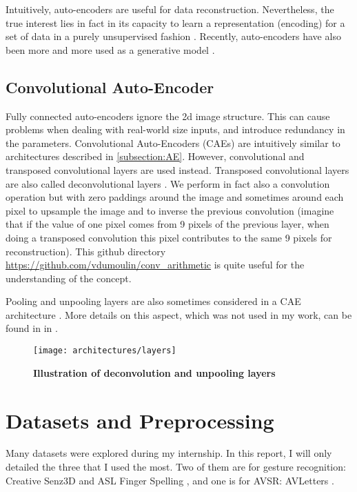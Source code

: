 Intuitively, auto-encoders are useful for data reconstruction.
Nevertheless, the true interest lies in fact in its capacity to learn
a representation (encoding) for a set of data in a purely unsupervised
fashion \cite{P. Vincent 2010}. Recently, auto-encoders have also
been more and more used as a generative model \cite{Y. Bengio 2013}.

\subsection{Convolutional Auto-Encoder}

Fully connected auto-encoders ignore the 2d image structure.
This can cause problems when dealing with real-world size inputs,
and introduce redundancy in the parameters.
Convolutional Auto-Encoders \cite{J. Masci 2011, V. Turchenko 2017}
(CAEs) are intuitively similar
to architectures described in \ref{subsection:AE}.
However, convolutional and transposed convolutional layers are used instead.
Transposed convolutional layers are also called deconvolutional
layers \cite{M. D. Zeiler 2011}.
We perform in fact also a convolution operation but with zero paddings
around the image and sometimes around each pixel to upsample the
image and to inverse the previous convolution
(imagine that if the value of one pixel comes from 9 pixels of the
previous layer, when doing a transposed convolution this pixel
contributes to the same 9 pixels for reconstruction).
This github directory
\href{https://github.com/vdumoulin/conv_arithmetic}
{https://github.com/vdumoulin/conv\_arithmetic}
is quite useful for the understanding of the concept.

Pooling and unpooling layers are also sometimes considered in a CAE
architecture \cite{V. Turchenko 2017}.
More details on this aspect, which was not used in my work, can be found in
in \cite{H. Noh 2015, V. Turchenko 2017}.


\begin{figure}[H]
  \centering
  \texttt{[image: architectures/layers]}
  \caption{%
    \textbf{Illustration of deconvolution and unpooling layers
      \cite{H. Noh 2015}}}
  \label{fig:layers}
\end{figure}

\section{Datasets and Preprocessing} \label{section:dataset}

Many datasets were explored during my internship. In this report,
I will only detailed the three that I used the most. Two of them are for
gesture recognition: Creative Senz3D \cite{A. Memo 2015, A. Memo 2017}
and ASL Finger Spelling \cite{N. Pugeault 2011}, and one is for AVSR:
AVLetters \cite{I. Matthews 2002}.

